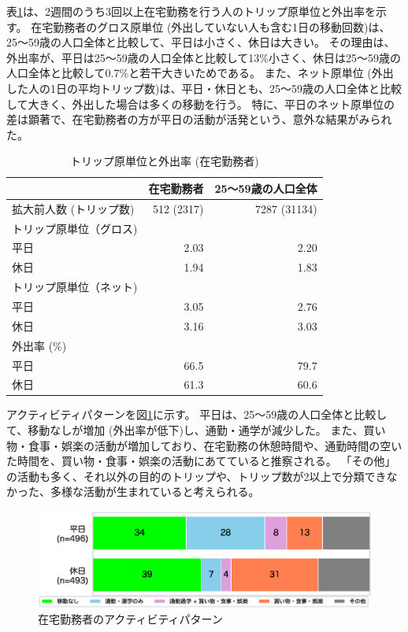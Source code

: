 \documentclass[a4paper,12pt, uplatex]{jsbook}
\begin{document}
表\ref{tab:トリップ_外出率_在宅}は、2週間のうち3回以上在宅勤務を行う人のトリップ原単位と外出率を示す。
在宅勤務者のグロス原単位 (外出していない人も含む1日の移動回数)は、25〜59歳の人口全体と比較して、平日は小さく、休日は大きい。
その理由は、外出率が、平日は25〜59歳の人口全体と比較して13\%小さく、休日は25〜59歳の人口全体と比較して0.7\%と若干大きいためである。
また、ネット原単位 (外出した人の1日の平均トリップ数)は、平日・休日とも、25〜59歳の人口全体と比較して大きく、外出した場合は多くの移動を行う。
特に、平日のネット原単位の差は顕著で、在宅勤務者の方が平日の活動が活発という、意外な結果がみられた。
%
\begin{table}[H]
\centering
\caption{トリップ原単位と外出率 (在宅勤務者)}
\label{tab:トリップ_外出率_在宅}
\begin{tabular}{lrr}
\toprule
& 在宅勤務者 & 25〜59歳の人口全体 \\
\midrule
拡大前人数 (トリップ数) & 512 (2317) & 7287 (31134)\\
トリップ原単位（グロス) & & \\
\hspace{2em} 平日 & 2.03 & 2.20 \\
\hspace{2em} 休日 & 1.94 & 1.83 \\
トリップ原単位（ネット) & & \\
\hspace{2em} 平日 & 3.05 & 2.76 \\
\hspace{2em} 休日 & 3.16 & 3.03\\
外出率 (\%) & & \\
\hspace{2em} 平日 & 66.5 & 79.7\\
\hspace{2em} 休日 & 61.3 & 60.6\\
\bottomrule
\end{tabular}
\end{table}

アクティビティパターンを図\ref{fig:activity_pattern_remote}に示す。
平日は、25〜59歳の人口全体と比較して、移動なしが増加 (外出率が低下)し、通勤・通学が減少した。
また、買い物・食事・娯楽の活動が増加しており、在宅勤務の休憩時間や、通勤時間の空いた時間を、買い物・食事・娯楽の活動にあてていると推察される。
「その他」の活動も多く、それ以外の目的のトリップや、トリップ数が2以上で分類できなかった、多様な活動が生まれていると考えられる。
%
\begin{figure}[H]
    \centering
    \includegraphics[width=1.0\textwidth]{picture/activity_pattern_在宅勤務者.eps}
    \caption{在宅勤務者のアクティビティパターン}
    \label{fig:activity_pattern_remote}
\end{figure}
\end{document}
